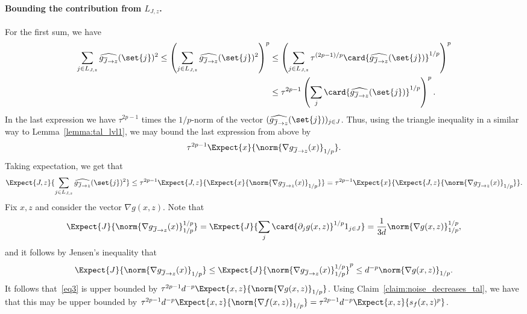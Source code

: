   \paragraph{Bounding the contribution from $L_{J,z}$.}
  For the first sum, we have
  \begin{align*}
  \sum\limits_{j\in L_{J,z}}\widehat{g_{\overline{J}\rightarrow z}}(\set{j})^2
  \leq
  \left(\sum\limits_{j\in L_{J,z}}\widehat{g_{\overline{J}\rightarrow z}}(\set{j})^2\right)^{p}
  &\leq \left(\sum\limits_{j\in L_{J,z}}\tau^{(2p-1)/p}\card{\widehat{g_{\overline{J}\rightarrow z}}(\set{j})}^{1/p}\right)^{p}\\
  &\leq \tau^{2p-1}\left(\sum\limits_{j}\card{\widehat{g_{\overline{J}\rightarrow z}}(\set{j})}^{1/p}\right)^{p}.
  \end{align*}
  In the last expression we have $\tau^{2p-1}$ times the $1/p$-norm of the vector $(\widehat{g_{\overline{J}\rightarrow z}}(\set{j}))_{j\in J}$.
  Thus, using the triangle inequality in a similar way to Lemma~\ref{lemma:tal_lvl1}, we may bound the last expression from above by
  \begin{equation}\label{eq3}
  \tau^{2p-1}\Expect{x}{\norm{\nabla{g_{\overline{J}\rightarrow z}}(x)}_{1/p}}.
  \end{equation}
  Taking expectation, we get that
  \[
  \Expect{J,z}{\sum\limits_{j\in L_{J,z}}\widehat{g_{\overline{J}\rightarrow z}}(\set{j})^2}
  \leq \tau^{2p-1}\Expect{J,z}{\Expect{x}{\norm{\nabla {g_{\overline{J}\rightarrow z}}(x)}_{1/p}}}
  = \tau^{2p-1}\Expect{x}{\Expect{J,z}{\norm{\nabla g_{\overline{J}\rightarrow z}(x)}_{1/p}}}.
  \]
  Fix $x,z$ and consider the vector $\nabla g(x,z)$.
  Note that
  \[
  \Expect{J}{\norm{\nabla g_{\overline{J}\rightarrow z}(x)}_{1/p}^{1/p}}
  =
  \Expect{J}{\sum\limits_{j}\card{\partial_j g(x,z)}^{1/p}1_{j\in J}}
  =\frac{1}{3d}\norm{\nabla g(x,z)}_{1/p}^{1/p},
  \]
  and it follows by Jensen's inequality that
  \[
  \Expect{J}{\norm{\nabla g_{\overline{J}\rightarrow z}(x)}_{1/p}}
  \leq
  \Expect{J}{\norm{\nabla g_{\overline{J}\rightarrow z}(x)}_{1/p}^{1/p}}^{p}
  \leq d^{-p} \norm{\nabla g(x,z)}_{1/p}.
  \]
  It follows that~\eqref{eq3} is upper bounded by $\tau^{2p-1}d^{-p}\Expect{x,z}{\norm{\nabla g(x,z)}_{1/p}}$.
  Using Claim~\ref{claim:noise_decreases_tal}, we have that this may be upper bounded by
  $\tau^{2p-1}d^{-p}\Expect{x,z}{\norm{\nabla f(x,z)}_{1/p}} = \tau^{2p-1}d^{-p} \Expect{x,z}{s_f(x,z)^p}$.



